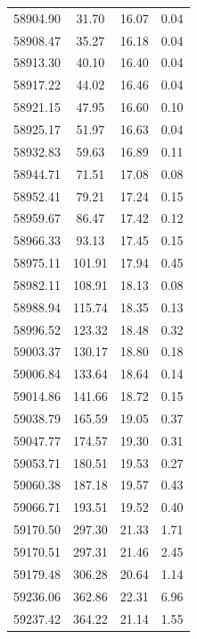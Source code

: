 \begin{longtable}{|c|c|c|c|}
 58904.90 &   31.70 &       16.07 &          0.04 \\
 58908.47 &   35.27 &       16.18 &          0.04 \\
 58913.30 &   40.10 &       16.40 &          0.04 \\
 58917.22 &   44.02 &       16.46 &          0.04 \\
 58921.15 &   47.95 &       16.60 &          0.10 \\
 58925.17 &   51.97 &       16.63 &          0.04 \\
 58932.83 &   59.63 &       16.89 &          0.11 \\
 58944.71 &   71.51 &       17.08 &          0.08 \\
 58952.41 &   79.21 &       17.24 &          0.15 \\
 58959.67 &   86.47 &       17.42 &          0.12 \\
 58966.33 &   93.13 &       17.45 &          0.15 \\
 58975.11 &  101.91 &       17.94 &          0.45 \\
 58982.11 &  108.91 &       18.13 &          0.08 \\
 58988.94 &  115.74 &       18.35 &          0.13 \\
 58996.52 &  123.32 &       18.48 &          0.32 \\
 59003.37 &  130.17 &       18.80 &          0.18 \\
 59006.84 &  133.64 &       18.64 &          0.14 \\
 59014.86 &  141.66 &       18.72 &          0.15 \\
 59038.79 &  165.59 &       19.05 &          0.37 \\
 59047.77 &  174.57 &       19.30 &          0.31 \\
 59053.71 &  180.51 &       19.53 &          0.27 \\
 59060.38 &  187.18 &       19.57 &          0.43 \\
 59066.71 &  193.51 &       19.52 &          0.40 \\
 59170.50 &  297.30 &       21.33 &          1.71 \\
 59170.51 &  297.31 &       21.46 &          2.45 \\
 59179.48 &  306.28 &       20.64 &          1.14 \\
 59236.06 &  362.86 &       22.31 &          6.96 \\
 59237.42 &  364.22 &       21.14 &          1.55 \\

\end{longtable}
